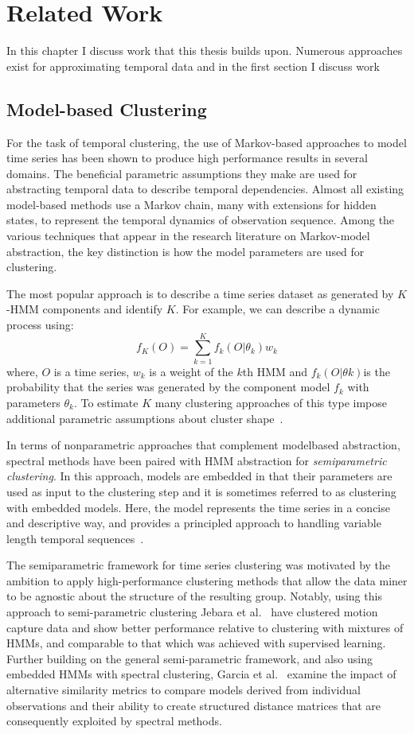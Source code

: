 \chapter{Related Work}
\label{ch:related}

In this chapter I discuss work that this thesis builds upon.  Numerous approaches exist for approximating temporal data and in the first section I discuss work
\section{Model-based Clustering}
\label{ch:related}
For the task of temporal clustering, the use of Markov-based approaches to model time series has been shown to produce high performance results in several domains.  The beneficial parametric assumptions they make are used for abstracting temporal data to describe temporal dependencies.  Almost all existing model-based methods use a Markov chain, many with extensions for hidden states, to represent the temporal dynamics of observation sequence.  Among the various techniques that appear in the research literature on Markov-model abstraction, the key distinction is how the model parameters are used for clustering.

The most popular approach is to describe a time series dataset as generated by $K$-HMM components and identify $K$.  For example, we can describe a dynamic process using:
      $$f_{K}(O)=\sum_{k=1}^{K}f_{k}(O|\theta_{k})w_{k}$$
where,  $O$ is a time series, $w_{k}$ is a weight of the $k$th HMM and $f_{k}(O|\theta{k})$is the probability that the series was generated by the component model $f_{k}$ with parameters $\theta_{k}$.  To estimate $K$ many clustering approaches of this type impose additional parametric assumptions about cluster shape~\cite{Shah2009,Zeng2006,preprints429}.

In terms of nonparametric approaches that complement modelbased abstraction, spectral methods have been paired with HMM abstraction for \emph{semiparametric clustering}.   In this approach, models are embedded in that their parameters are used as input to the clustering step and it is sometimes referred to as clustering with embedded models.   Here, the model represents the time series in a concise and descriptive way, and provides a principled approach to handling variable length temporal sequences~\cite{Yin_Yang_2005,Jebara_07}.  

 The semiparametric framework for time series clustering was motivated by the ambition to apply high-performance clustering methods that allow the data miner to be agnostic about the structure of the resulting group.   Notably, using this approach to semi-parametric clustering Jebara et al.~\cite{Jebara_07} have clustered motion capture data and show better performance relative to clustering with mixtures of HMMs, and comparable to that which was achieved with supervised learning.  Further building on the general semi-parametric framework, and also using embedded HMMs with spectral clustering, Garcia et al.~\cite{GarciaHD09,Garcia2011} examine the impact of alternative similarity metrics to compare models derived from individual observations and their ability to create structured distance matrices that are consequently exploited by spectral methods.

